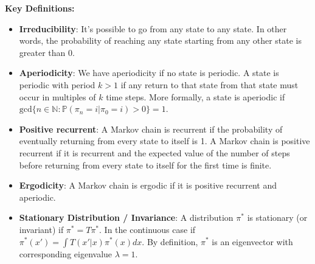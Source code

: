 \documentclass{article}
\begin{document}
\begin{center}
\end{center}

\textbf{Key Definitions:}
\begin{itemize}
    \item  \textbf{Irreducibility}: It's possible to go from any state to any state. In other words, the probability of reaching any state starting from any other state is greater than 0.
    
    \item  \textbf{Aperiodicity}: We have aperiodicity if no state is periodic. A state is periodic with period $k>1$ if any return to that state from that state must occur in multiples of $k$ time steps. More formally, a state is aperiodic if  $\mathrm{gcd}\{n \in \mathbb{N}: \mathbb{P}(\pi_n =i | \pi_0 = i) > 0\} =1 $. 
    
    \item  \textbf{Positive recurrent}: A Markov chain is recurrent if the probability of eventually returning from every state to itself is 1. A Markov chain is positive recurrent if it is recurrent and the expected value of the number of steps before returning from every state to itself for the first time is finite.
    
    \item  \textbf{Ergodicity}: A Markov chain is ergodic if it is positive recurrent and aperiodic.

    \item  \textbf{Stationary Distribution / Invariance}: A distribution $\pi^*$ is stationary (or invariant) if $ \pi^* = T \pi^*$. In the continuous case if $\pi^*(x') = \int T(x'|x) \pi^*(x) dx$. By definition, $\pi^*$ is an eigenvector with corresponding eigenvalue $\lambda = 1$.


\end{itemize}
\end{document}
